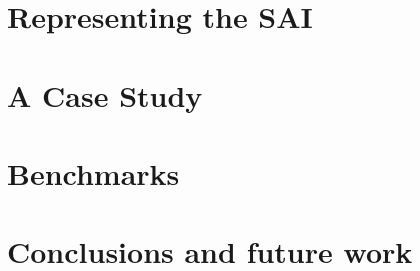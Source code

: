 \documentclass{acm_proc_article-sp}
\begin{document}
\section{Representing the SAI}
\label{sec:compiling_scripts}
 

\section{A Case Study}
\label{sec:case_study}


\section{Benchmarks}
\label{sec:benchmarks}
 

\section{Conclusions and future work}
\label{sec:conclusions}
 


 

\nocite{}
\end{document}
